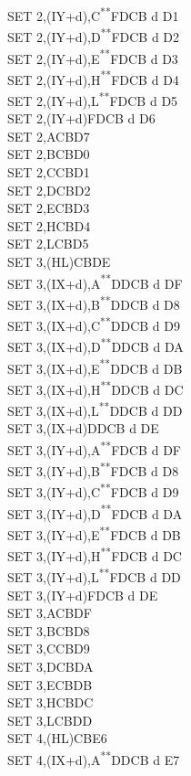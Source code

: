 \documentclass[12pt,twoside,openright,a4paper]{book}
\newcommand{\UNDOC}{\textnormal{\textsuperscript{**}}}
\begin{document}
\begin{multicols}{3}
{\begin{tabbing}
	SET 2,(IY+d),C\UNDOC\>FDCB d D1\\
	SET 2,(IY+d),D\UNDOC\>FDCB d D2\\
	SET 2,(IY+d),E\UNDOC\>FDCB d D3\\
	SET 2,(IY+d),H\UNDOC\>FDCB d D4\\
	SET 2,(IY+d),L\UNDOC\>FDCB d D5\\
	SET 2,(IY+d)\>FDCB d D6\\
	SET 2,A\>CBD7\\
	SET 2,B\>CBD0\\
	SET 2,C\>CBD1\\
	SET 2,D\>CBD2\\
	SET 2,E\>CBD3\\
	SET 2,H\>CBD4\\
	SET 2,L\>CBD5\\
	SET 3,(HL)\>CBDE\\
	SET 3,(IX+d),A\UNDOC\>DDCB d DF\\
	SET 3,(IX+d),B\UNDOC\>DDCB d D8\\
	SET 3,(IX+d),C\UNDOC\>DDCB d D9\\
	SET 3,(IX+d),D\UNDOC\>DDCB d DA\\
	SET 3,(IX+d),E\UNDOC\>DDCB d DB\\
	SET 3,(IX+d),H\UNDOC\>DDCB d DC\\
	SET 3,(IX+d),L\UNDOC\>DDCB d DD\\
	SET 3,(IX+d)\>DDCB d DE\\
	SET 3,(IY+d),A\UNDOC\>FDCB d DF\\
	SET 3,(IY+d),B\UNDOC\>FDCB d D8\\
	SET 3,(IY+d),C\UNDOC\>FDCB d D9\\
	SET 3,(IY+d),D\UNDOC\>FDCB d DA\\
	SET 3,(IY+d),E\UNDOC\>FDCB d DB\\
	SET 3,(IY+d),H\UNDOC\>FDCB d DC\\
	SET 3,(IY+d),L\UNDOC\>FDCB d DD\\
	SET 3,(IY+d)\>FDCB d DE\\
	SET 3,A\>CBDF\\
	SET 3,B\>CBD8\\
	SET 3,C\>CBD9\\
	SET 3,D\>CBDA\\
	SET 3,E\>CBDB\\
	SET 3,H\>CBDC\\
	SET 3,L\>CBDD\\
	SET 4,(HL)\>CBE6\\
	SET 4,(IX+d),A\UNDOC\>DDCB d E7\\

\end{tabbing}}
\end{multicols}
\end{document}
